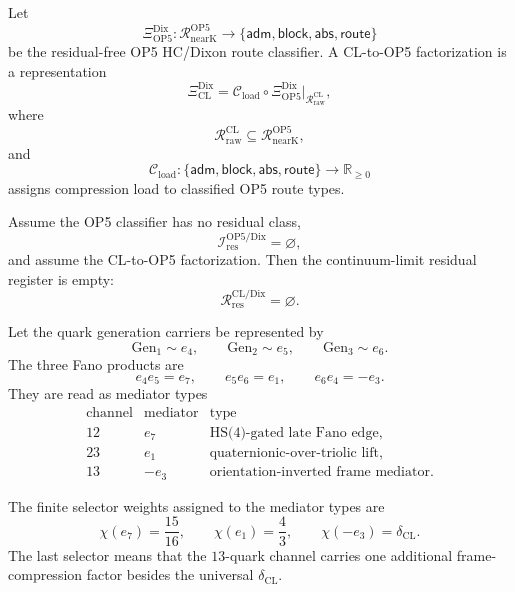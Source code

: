 \begin{definition}
Let
\[
  \Xi_{\mathrm{OP5}}^{\mathrm{Dix}}
  :
  \mathcal R_{\mathrm{nearK}}^{\mathrm{OP5}}
  \longrightarrow
  \{\mathsf{adm},\mathsf{block},\mathsf{abs},\mathsf{route}\}
\]
be the residual-free OP5 HC/Dixon route classifier.  A CL-to-OP5 factorization is a representation
\[
  \Xi_{\mathrm{CL}}^{\mathrm{Dix}}
  =
  \mathcal C_{\mathrm{load}}
  \circ
  \Xi_{\mathrm{OP5}}^{\mathrm{Dix}}
  \big|_{\mathcal R_{\mathrm{raw}}^{\mathrm{CL}}},
\]
where
\[
  \mathcal R_{\mathrm{raw}}^{\mathrm{CL}}
  \subseteq
  \mathcal R_{\mathrm{nearK}}^{\mathrm{OP5}},
\]
and
\[
  \mathcal C_{\mathrm{load}}
  :
  \{\mathsf{adm},\mathsf{block},\mathsf{abs},\mathsf{route}\}
  \to
  \mathbb R_{\ge0}
\]
assigns compression load to classified OP5 route types.
\end{definition}

\begin{lemma}
Assume the OP5 classifier has no residual class,
\[
  \mathcal I_{\mathrm{res}}^{\mathrm{OP5/Dix}}=\varnothing,
\]
and assume the CL-to-OP5 factorization.  Then the continuum-limit residual register is empty:
\[
  \mathcal R_{\mathrm{res}}^{\mathrm{CL/Dix}}=\varnothing.
\]
\end{lemma}

\begin{definition}
Let the quark generation carriers be represented by
\[
  \mathrm{Gen}_1\sim e_4,
  \qquad
  \mathrm{Gen}_2\sim e_5,
  \qquad
  \mathrm{Gen}_3\sim e_6.
\]
The three Fano products are
\[
  e_4e_5=e_7,\qquad
  e_5e_6=e_1,\qquad
  e_6e_4=-e_3.
\]
They are read as mediator types
\[
\begin{array}{c|c|c}
\text{channel} & \text{mediator} & \text{type}\\
\hline
12 & e_7 & \text{HS(4)-gated late Fano edge},\\
23 & e_1 & \text{quaternionic-over-triolic lift},\\
13 & -e_3 & \text{orientation-inverted frame mediator}.
\end{array}
\]
\end{definition}

\begin{definition}
The finite selector weights assigned to the mediator types are
\[
  \chi(e_7)=\frac{15}{16},
  \qquad
  \chi(e_1)=\frac43,
  \qquad
  \chi(-e_3)=\delta_{\mathrm{CL}}.
\]
The last selector means that the \(13\)-quark channel carries one additional frame-compression factor besides the universal \(\delta_{\mathrm{CL}}\).
\end{definition}

